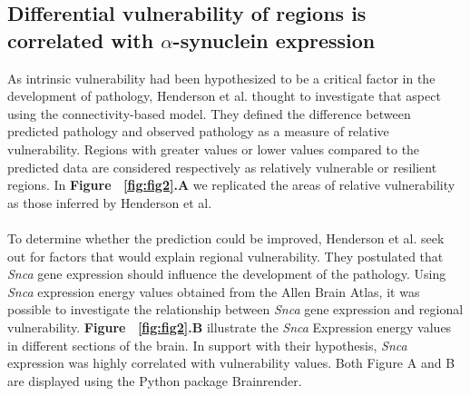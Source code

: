 \subsection{Differential vulnerability of regions is correlated with $\alpha$-synuclein expression}
As intrinsic vulnerability had been hypothesized to be a critical factor in the development of pathology, Henderson et al. thought to investigate that aspect using the connectivity-based model. They defined the difference between predicted pathology and observed pathology as a measure of relative vulnerability. Regions with greater values or lower values compared to the predicted data are considered respectively as relatively vulnerable or resilient regions. In \textbf{Figure ~\ref{fig:fig2}.A} we replicated the areas of relative vulnerability as those inferred by Henderson et al.\\
\\
To determine whether the prediction could be improved, Henderson et al. seek out for factors that would explain regional vulnerability. They postulated that \textit{Snca} gene expression should influence the development of the pathology. Using \textit{Snca} expression energy values obtained from the Allen Brain Atlas, it was possible to investigate the relationship between \textit{Snca} gene expression and regional vulnerability. \textbf{Figure ~\ref{fig:fig2}.B} illustrate the \textit{Snca} Expression energy values in different sections of the brain. In support with their hypothesis, \textit{Snca} expression was highly correlated with vulnerability values. Both Figure A and B are displayed using the Python package Brainrender. \cite{Claudi_2021}
\\
